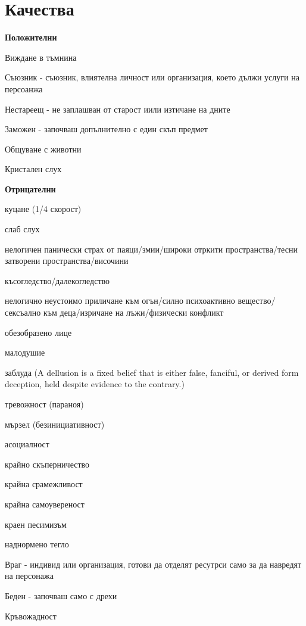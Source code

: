 \section{Качества}

\textbf{Положителни}
\begin{itemize*}
\item{Виждане в тъмнина}
\item{Съюзник - съюзник, влиятелна личност или организация, което дължи услуги на персоанжа}
\item{Нестареещ - не заплашван от старост иили изтичане на дните}
\item{Заможен - започваш допълнително с един скъп предмет}
\item{Общуване с животни}
\item{Кристален слух}
\end{itemize*}

\vspace{0.7cm}
\textbf{Отрицателни}
\begin{itemize*}
\item{куцане (1/4 скорост)}
\item{слаб слух}
\item{нелогичен панически страх от паяци/змии/широки отркити пространства/тесни затворени пространства/височини}
\item{късогледство/далекогледство}
\item{нелогично неустоимо приличане към огън/силно психоактивно вещество/сексъално към деца/изричане на лъжи/физически конфликт}
\item{обезобразено лице}
\item{малодушие}
\item{заблуда (A dellusion is a fixed belief that is either false, fanciful, or derived form deception, held despite evidence to the contrary.)}
\item{тревожност (параноя)}
\item{мързел (безинициативност)}
\item{асоциалност}
\item{крайно скъперничество}
\item{крайна срамежливост}
\item{крайна самоувереност}
\item{краен песимизъм}
\item{наднормено тегло}
\item{Враг - индивид или организация, готови да отделят ресутрси само за да навредят на персонажа}
\item{Беден - започваш само с дрехи}
\item{Кръвожадност}
\end{itemize*}

